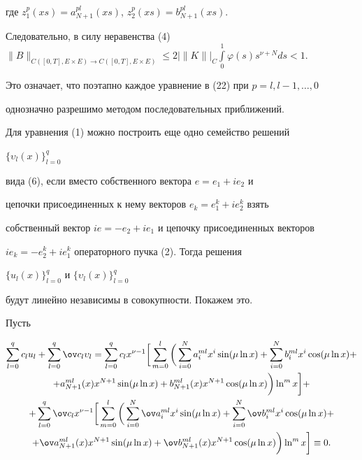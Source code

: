 где $z^p_1(xs)=a^{pl}_{N+1}(xs)$, $z^p_2(xs)=b^{pl}_{N+1}(xs)$. 


 


Следовательно, в силу неравенства (4) $\|B\|_{C([0,T],E\times E)\to 


C([0,T],E\times E)}\le2\big|\|K\|\big|_C\int\limits^1_0 


\varphi(s)s^{\nu+N}ds<1$. 


 


Это означает, что поэтапно каждое уравнение в (22) при $p=l,l-1,\dotsc,0$ 


однозначно разрешимо методом последовательных приближений. 


 


Для уравнения (1) можно построить еще одно семейство решений 


$\{\upsilon_l(x)\}^q_{l=0}$ 


вида (6), если вместо собственного вектора $e=e_1+ie_2$ и 


цепочки присоединенных к нему векторов $e_k=e^k_1+ie^k_2$ взять 


собственный вектор $ie=-e_2+ie_1$ и цепочку присоединенных векторов 


$ie_k=-e^k_2+ie^k_1$ операторного пучка (2). Тогда решения 


$\{u_l(x)\}^q_{l=0}$ и $\{\upsilon_l(x)\}^q_{l=0}$ 


будут линейно независимы в совокупности. Покажем это. 


 


Пусть 


\begin{gather*} 


\sum^q_{l=0}c_l u_l+\sum^q_{l=0}\ov c_l \upsilon_l=\sum^q_{l=0} 


c_l x^{\nu-1}\bigg[\sum^l_{m=0}\bigg(\sum^N_{i=0} 


a^{ml}_i x^i\sin(\mu\ln x)+\sum^N_{i=0}b^{ml}_i x^i 


\cos(\mu\ln x)+ \\ 


% 


+a^{ml}_{N+1}(x)x^{N+1}\sin(\mu\ln x)+ 


b^{ml}_{N+1}(x)x^{N+1}\cos(\mu\ln x)\bigg)\ln^m x\bigg]+ \\


% 


+\sum^q_{l=0}\ov c_l x^{\nu-1}\bigg[\sum^l_{m=0}\bigg( 


\sum^N_{i=0}\ov a^{ml}_i x^i\sin(\mu\ln x)+ 


\sum^N_{i=0}\ov b^{ml}_i x^i\cos(\mu\ln x)+\\ 


% 


+\ov a^{ml}_{N+1}(x)x^{N+1}\sin(\mu\ln x)+ 


\ov b^{ml}_{N+1}(x)x^{N+1}\cos(\mu\ln x)\bigg)\ln^m 


x\bigg]\equiv0. 


\end{gather*} 



